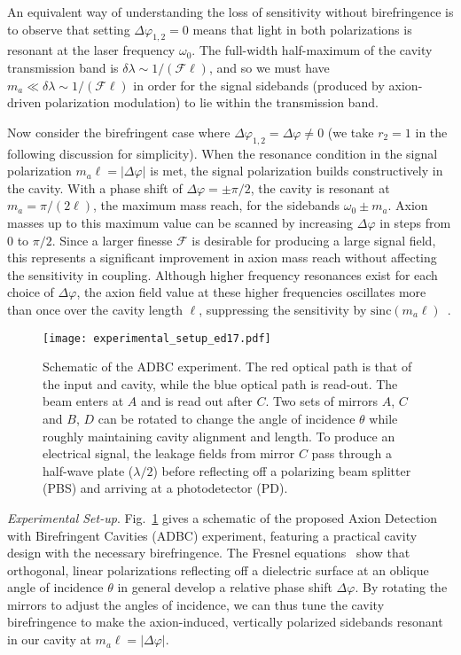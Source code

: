 \documentclass[aps,prd,nofootinbib,twocolumn,superscriptaddress,preprintnumbers,letterpaper, longbibliography]{revtex4-1}
\begin{document}
An equivalent way of understanding the loss of sensitivity without birefringence is to observe that setting $\Delta \varphi_{1,2} = 0$ means that light in both polarizations is resonant at the laser frequency $\omega_0$. The full-width half-maximum of the cavity transmission band is $\delta \lambda \sim 1/(\mathcal{F} \ell)$, and so we must have $m_a \ll \delta \lambda \sim 1/(\mathcal{F} \ell)$ in order for the signal sidebands (produced by axion-driven polarization modulation) to lie within the transmission band. 

Now consider the birefringent case where $\Delta \varphi_{1,2} = \Delta \varphi \neq 0$ (we take $r_2 = 1$ in the following discussion for simplicity). When the resonance condition in the signal polarization $m_a \ell = |\Delta \varphi|$ is met, the signal polarization builds constructively in the cavity. With a phase shift of $\Delta \varphi = \pm \pi/2$, the cavity is resonant at $m_a = \pi/(2\ell)$, the maximum mass reach, for the sidebands $\omega_0 \pm m_a$. Axion masses up to this maximum value can be scanned by increasing $\Delta \varphi$ in steps from 0 to $\pi/2$. Since a larger finesse $\mathcal{F}$ is desirable for producing a large signal field, this represents a significant improvement in axion mass reach without affecting the sensitivity in coupling. Although higher frequency resonances exist for each choice of $\Delta \varphi$, the axion field value at these higher frequencies oscillates more than once over the cavity length $\ell$, suppressing the sensitivity by $\text{sinc}(m_a \ell)$~\cite{Maggiore:1900zz}. 
%
\begin{figure}
    \centering
    \texttt{[image: experimental\_setup\_ed17.pdf]}
    \caption{Schematic of the ADBC experiment. The red optical path is that of the input and cavity, while the blue optical path is read-out. The beam enters at $A$ and is read out after $C$. Two sets of mirrors $A$, $C$ and $B$, $D$ can be rotated to change the angle of incidence $\theta$ while roughly maintaining cavity alignment and length. To produce an electrical signal, the leakage fields from mirror $C$ pass through a half-wave plate ($\lambda/2$) before reflecting off a polarizing beam splitter (PBS) and arriving at a photodetector (PD).
\label{fig:design}}
\end{figure}
%

\vspace{0.2cm}
\textit{Experimental Set-up}. 
\label{experimentalsetup}
Fig.~\ref{fig:design} gives a schematic of the proposed Axion Detection with Birefringent Cavities (ADBC) experiment, featuring a practical cavity design with the necessary birefringence. The Fresnel equations~\cite{hecht2016optics} show that orthogonal, linear polarizations reflecting off a dielectric surface at an oblique angle of incidence $\theta$ in general develop a relative phase shift $\Delta \varphi$. By rotating the mirrors to adjust the angles of incidence, we can thus tune the cavity birefringence to make the axion-induced, vertically polarized sidebands resonant in our cavity at $m_a \ell = |\Delta \varphi|$.
\end{document}
